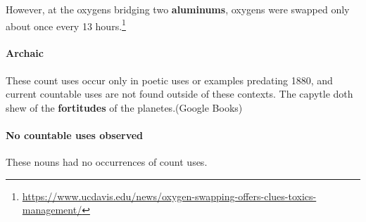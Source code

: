 \documentclass[output=paper]{langscibook}
\begin{document}
\eanoraggedright \label{gri-ric:ex:oxygens}
However, at the oxygens bridging two \textbf{aluminums}, oxygens were swapped only about once every 13 hours.\footnote{\url{https://www.ucdavis.edu/news/oxygen-swapping-offers-clues-toxics-management/}}
\z 



\paragraph*{Archaic} These count uses occur only in poetic uses or examples predating 1880, and current countable uses are not found outside of these contexts. 
\eanoraggedright 
The capytle doth shew of the \textbf{fortitudes} of the planetes.\hfill (Google Books)
\z


\paragraph*{No countable uses observed}  These nouns had no occurrences of count uses. 

\bigskip
\end{document}
